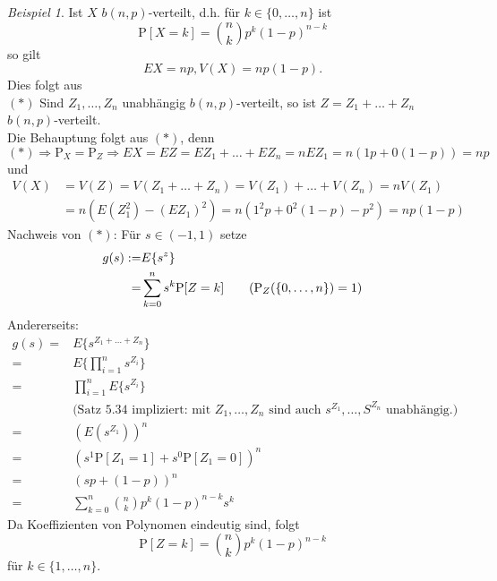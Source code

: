 \documentclass[a4paper,12pt,fleqn]{scrartcl}
\newcommand{\impl}{\Rightarrow}
\theoremstyle{definition}
\theoremstyle{plain}
\theoremstyle{remark}
\newtheorem{beispiel}[definition]{Beispiel}
\begin{document}
\begin{beispiel}
Ist $X$ $b(n,p)$-verteilt, d.h. für $k\in\{ 0,\ldots,n\}$ ist
\[\text{P}[X=k]=\binom{n}{k}p^k(1-p)^{n-k}\]
so gilt
\[EX=np,V(X)=np(1-p).\]
Dies folgt aus\\
$(*)$ Sind $Z_1,\ldots,Z_n$ unabhängig $b(n,p)$-verteilt, so ist $Z=Z_1+\ldots+Z_n$ $b(n,p)$-verteilt.\\
Die Behauptung folgt aus $(*)$, denn
\[(*)\impl \text{P}_X=\text{P}_Z\impl EX=EZ=EZ_1+\ldots+EZ_n=nEZ_1=n(1p+0(1-p))=np\]
und
\begin{align*}
V(X)&=V(Z)=V(Z_1+\ldots+Z_n)=V(Z_1)+\ldots+V(Z_n)=nV(Z_1)\\&=n(E(Z_1^2)-(EZ_1)^2)=n(1^2p+0^2(1-p)-p^2)=np(1-p)
\end{align*}
Nachweis von $(*)$: Für $s\in(-1,1)$ setze
\begin{align*}
g(s):=&E\{ s^z\} \\
=&\sum_{k=0}^ns^k\text{P}[Z=k] \tag{$\text{P}_Z(\{ 0,\ldots,n\})=1$}
\end{align*}
Andererseits:
\begin{align*}
g(s)=&E\{ s^{Z_1+\ldots+Z_n}\}\\
=&E\{\prod_{i=1}^ns^{Z_i}\}\\
=&\prod_{i=1}^nE\{ s^{Z_i}\}\\
&\text{(Satz 5.34 impliziert: mit }Z_1,\ldots,Z_n\text{ sind auch }s^{Z_1},\ldots,S^{Z_n}\text{ unabhängig.)}\\
=&(E(s^{Z_1}))^n\\
=&(s^1\text{P}[Z_1=1]+s^0\text{P}[Z_1=0])^n\\
=&(sp+(1-p))^n\\
=&\sum_{k=0}^n\binom{n}{k}p^k(1-p)^{n-k}s^k
\end{align*}
Da Koeffizienten von Polynomen eindeutig sind, folgt
\[\text{P}[Z=k]=\binom{n}{k}p^k(1-p)^{n-k}\]
für $k\in\{1,\ldots,n\}$.
\end{beispiel}

\end{document}
